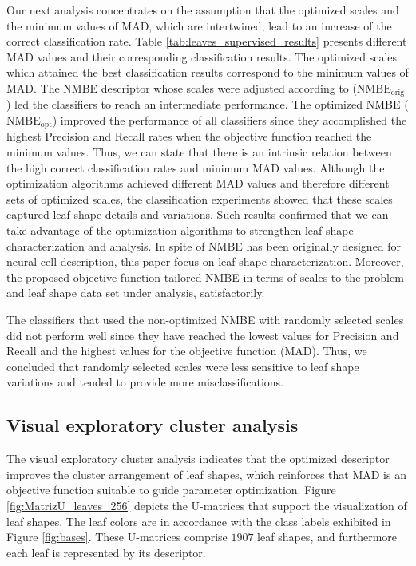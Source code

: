 Our next analysis concentrates on the assumption that the optimized scales and the minimum values of MAD, which are intertwined, lead to an increase of the correct classification rate.
Table \ref{tab:leaves_supervised_results} presents different MAD values and their corresponding classification results. The optimized scales which attained the best classification results correspond to the minimum values of MAD. The NMBE descriptor whose scales were adjusted according to  ($\operatorname{NMBE_{orig}}$) led the classifiers to reach an intermediate performance. The optimized NMBE ($\operatorname{NMBE_{opt}}$) improved the performance of all classifiers since they accomplished the highest Precision and Recall rates when the objective function reached the minimum values. Thus, we can state that there is an intrinsic relation between the high correct classification rates and minimum MAD values.
Although the optimization algorithms achieved different MAD values and therefore different sets of optimized scales, the classification experiments showed that these scales captured leaf shape details and variations. Such results confirmed that we can take advantage of the optimization algorithms to strengthen leaf shape characterization and analysis. 
In spite of NMBE has been originally designed for neural cell description, this paper focus on leaf shape characterization. Moreover, the proposed objective function tailored NMBE in terms of scales to the problem and leaf shape data set under analysis, satisfactorily. 
  
The classifiers that used the non-optimized NMBE with randomly selected scales did not perform well since they have reached the lowest values for Precision and Recall and the highest values for the objective function (MAD). 
Thus, we concluded that randomly selected scales were less sensitive to leaf shape variations and tended to provide more misclassifications. 

\subsection{Visual exploratory cluster analysis}
The visual exploratory cluster analysis indicates that the optimized descriptor improves the cluster arrangement of leaf shapes, which reinforces that MAD is an objective function suitable to guide parameter optimization. 
Figure \ref{fig:MatrizU_leaves_256}  depicts the U-matrices that support the visualization of leaf shapes. The leaf colors are in accordance with the class labels exhibited in Figure \ref {fig:bases}. These U-matrices comprise $1907$ leaf shapes, and furthermore each leaf is represented by its descriptor. 

